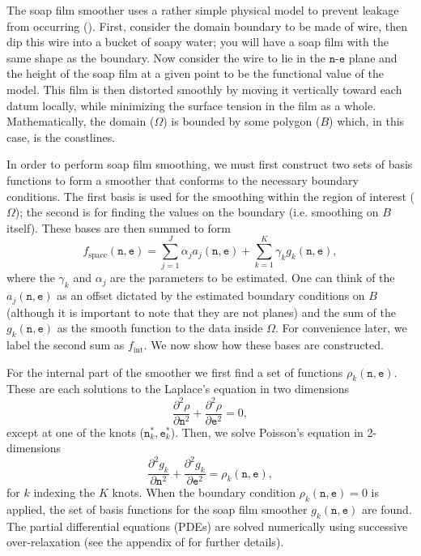 The soap film smoother uses a rather simple physical model to prevent leakage from occurring (\cite{soap}). First, consider the domain boundary to be made of wire, then dip this wire into a bucket of soapy water; you will have a soap film with the same shape as the boundary. Now consider the wire to lie in the $\texttt{n}$-$\texttt{e}$ plane and the height of the soap film at a given point to be the functional value of the model. This film is then distorted smoothly by moving it vertically toward each datum locally, while minimizing the surface tension in the film as a whole. Mathematically, the domain ($\Omega$) is bounded by some polygon ($B$) which, in this case, is the coastlines.

In order to perform soap film smoothing, we must first construct two sets of basis functions to form a smoother that conforms to the necessary boundary conditions. The first basis is used for the smoothing within the region of interest ($\Omega$); the second is for finding the values on the boundary (i.e. smoothing on $B$ itself). These bases are then summed to form
$$
f_\text{space}(\texttt{n},\texttt{e})=\sum_{j=1}^J \alpha_j a_j(\texttt{n},\texttt{e}) + \sum_{k=1}^K \gamma_k g_k(\texttt{n},\texttt{e}),
$$
where the $\gamma_k$ and $\alpha_j$ are the parameters to be estimated. One can think of the $a_j(\texttt{n},\texttt{e})$ as an offset dictated by the estimated boundary conditions on $B$ (although it is important to note that they are not planes) and the sum of the $g_k(\texttt{n},\texttt{e})$ as the smooth function to the data inside $\Omega$. For convenience later, we label the second sum as $f_\text{int}$. We now show how these bases are constructed.

For the internal part of the smoother we first find a set of functions $\rho_k(\texttt{n},\texttt{e})$. These are each solutions to the Laplace's equation in two dimensions
$$
\frac{\partial^2\rho}{\partial \texttt{n}^2} + \frac{\partial^2\rho}{\partial \texttt{e}^2} = 0,
$$
except at one of the knots ($\texttt{n}^*_k,\texttt{e}^*_k$). Then, we solve Poisson's equation in 2-dimensions
\begin{equation}
\frac{\partial^2 g_k}{\partial \texttt{n}^2} + \frac{\partial^2 g_k}{\partial \texttt{e}^2} = \rho_k(\texttt{n},\texttt{e}),
\label{soap-poisson}
\end{equation}
for $k$ indexing the $K$ knots. When the boundary condition $\rho_k(\texttt{n},\texttt{e})=0$ is applied, the set of basis functions for the soap film smoother $g_k(\texttt{n},\texttt{e})$ are found.  The partial differential equations (PDEs) are solved numerically using successive over-relaxation (see the appendix of \cite{soap} for further details).

